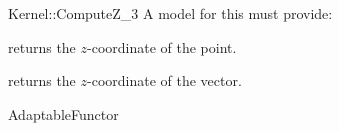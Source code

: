 \begin{ccRefFunctionObjectConcept}{Kernel::ComputeZ_3}
A model for this must provide:


       {returns the $z$-coordinate of the point.}

       {returns the $z$-coordinate of the vector.}

\ccRefines
AdaptableFunctor



\end{ccRefFunctionObjectConcept}
